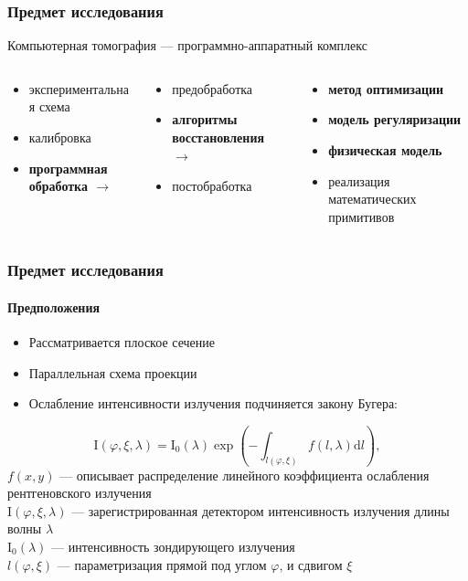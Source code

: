 \documentclass[12pt]{beamer}
\begin{document}
\begin{frame}
\frametitle{Предмет исследования}
Компьютерная томография --- программно-аппаратный комплекс
\setlength{\leftmargini}{0em}
\begin{columns}[T,onlytextwidth]
  \begin{column}{.4\textwidth}
  \begin{itemize}
    \item экспериментальная схема
    \item калибровка 
    \item \textbf{программная обработка $\rightarrow$}
  \end{itemize}
  \end{column}
  \pause
  \begin{column}[t]{0.4\linewidth}
  \begin{itemize}
    \item предобработка
    \item \textbf{алгоритмы восстановления $\rightarrow$}
    \item постобработка
  \end{itemize}
  \end{column}
  \pause
  \begin{column}[t]{0.35\linewidth}
  \begin{itemize}
    \item \textbf{метод оптимизации}
    \item \textbf{модель регуляризации}
    \item \textbf{физическая модель}
    \item реализация математических примитивов
  \end{itemize}
  \end{column}
\end{columns}
\end{frame}
\endgroup

\begin{frame}
\frametitle{Предмет исследования}
\framesubtitle{Предположения}
\begin{itemize}
  \item Рассматривается плоское сечение
  \item Параллельная схема проекции
  \item Ослабление интенсивности излучения подчиняется закону Бугера:
\end{itemize}
  $$
  \mathrm I \left( \varphi, \xi , \lambda \right) = \mathrm I_0(\lambda) \exp\left( {-\int_{l(\varphi, \xi)} \! f(l, \lambda) \mathrm d l }\right),
  $$
  \small
  $f(x, y)$ ---  описывает распределение линейного коэффициента ослабления рентгеновского излучения \\
  $\mathrm I(\varphi, \xi, \lambda)$ --- зарегистрированная детектором интенсивность излучения длины волны $\lambda$ \\
  $\mathrm I_0(\lambda)$ --- интенсивность зондирующего излучения \\
  $l(\varphi, \xi)$ --- параметризация прямой под углом $\varphi$, и сдвигом $\xi$ \\
\end{frame}
\end{document}
